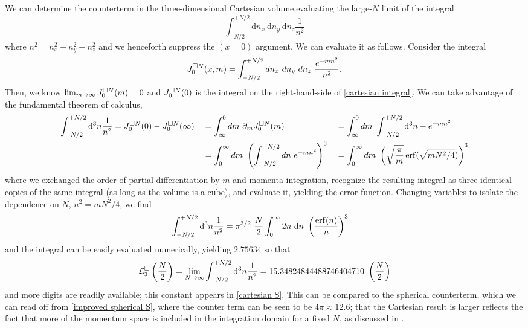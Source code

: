 We can determine the counterterm in the three-dimensional Cartesian volume,evaluating the large-$N$ limit of the integral
\begin{equation}\label{eq:cartesian integral}
    \int_{-N/2}^{+N/2} \mathrm{d}n_x\ \mathrm{d}n_y\ \mathrm{d}n_z \frac{1}{n^2}
\end{equation}
where $n^2 = n_x^2+n_y^2+n_z^2$ and we henceforth suppress the $(x=0)$ argument.
We can evaluate it as follows.  Consider the integral
\begin{equation}
	J^{\square N}_0(x, m) = \int_{-N/2}^{+N/2} dn_x\ dn_y\ dn_z\ \frac{e^{-m n^2}}{n^2}.
\end{equation}
Then, we know $\lim_{m\rightarrow\infty} J^{\square N}_0(m) = 0$ and $J^{\square N}_0(0)$ is the integral on the right-hand-side of \eqref{cartesian integral}.
We can take advantage of the fundamental theorem of calculus,
\begin{align}
	\int_{-N/2}^{+N/2} \mathrm{d}^3n \frac{1}{n^2}
    &=
    J^{\square N}_0(0) - J^{\square N}_0(\infty)
		&&= 	\int_{\infty}^{0} dm\ \partial_m J^{\square N}_0(m)
		&&=	\int_{\infty}^{0} dm\ \int_{-N/2}^{+N/2} \mathrm{d}^3n -e^{-m n^2}
		\nonumber\\
		&&&=	\int_0^\infty dm\ \left(\int_{-N/2}^{+N/2} dn\ e^{-m n^2}\right)^3
		&&=	\int_0^\infty dm\ \left(\sqrt{\frac{\pi}{m}} \operatorname{erf}(\sqrt{m N^2/4})\right)^3
\end{align}
where we exchanged the order of partial differentiation by $m$ and momenta integration, recognize the resulting integral as three identical copies of the same integral (as long as the volume is a cube), and evaluate it, yielding the error function.
Changing variables to isolate the dependence on $N$, $n^2 = m N^2/4$, we find
\begin{align}
    \int_{-N/2}^{+N/2} \mathrm{d}^3n \frac{1}{n^2}
    &=
    \pi^{3/2}\ \frac{N}{2} \int_{0}^\infty 2n\ \mathrm{d}n\ \left(\frac{\operatorname{erf}(n)}{n}\right)^3
\end{align}
and the integral can be easily evaluated numerically, yielding $2.75634$ so that
\begin{equation}
    \label{eq:cartesian counterterm}
    \mathcal{L}^\square_3 \left(\frac{N}{2}\right) = \lim_{N\rightarrow\infty}\int_{-N/2}^{+N/2} \mathrm{d}^3n \frac{1}{n^2} = 15.34824844488746404710\ \left(\frac{N}{2}\right)
\end{equation}
and more digits are readily available; this constant appears in \eqref{cartesian S}.
This can be compared to the spherical counterterm, which we can read off from \eqref{improved spherical S}, where the counter term can be seen to be $4\pi \approx 12.6 $; that the Cartesian result is larger reflects the fact that more of the momentum space is included in the integration domain for a fixed $N$, as discussed in .

